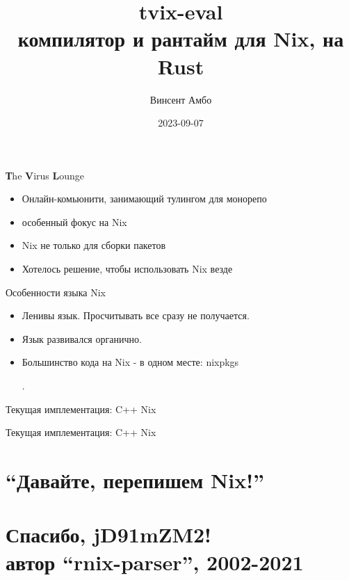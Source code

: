 \documentclass[12pt]{beamer}
\title{tvix-eval \\ компилятор и рантайм для Nix, на Rust}
\date{2023-09-07}
\author{Винсент Амбо}
\institute{TVL}
\newenvironment{code}{\ttfamily}{\par}
\begin{document}
  \begin{frame}
    \begin{center}
      \titlepage
    \end{center}
  \end{frame}

  \begin{frame}{\textbf{Т}he \textbf{V}irus \textbf{L}ounge}
    \begin{itemize}
    \item Онлайн-комьюнити, занимающий тулингом для монорепо
    \item особенный фокус на Nix
    \item Nix не только для сборки пакетов
    \item Хотелось решение, чтобы использовать Nix везде
    \end{itemize}
  \end{frame}

  \begin{frame}{Особенности языка Nix}
    \begin{itemize}
    \item Ленивы язык. Просчитывать все сразу не получается.
    \item Язык развивался органично.
    \item Большинство кода на Nix - в одном месте: \begin{code}nixpkgs\end{code}.
    \end{itemize}
  \end{frame}

  \begin{frame}{Текущая имплементация: C++ Nix}
    
  \end{frame}

  \begin{frame}{Текущая имплементация: C++ Nix}
    
  \end{frame}

  \section{``Давайте, перепишем Nix!''}

  \section*{Спасибо, jD91mZM2!\\\normalsize{автор ``rnix-parser'', 2002-2021}}
\end{document}
